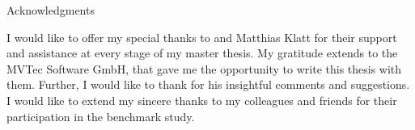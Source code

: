 
\vspace*{20mm}

\begin{center}
{ Acknowledgments}

\vspace{20mm}

I would like to offer my special thanks to \getAdvisor \space and Matthias Klatt for their support and assistance at every stage of my master thesis.
My gratitude extends to the MVTec Software GmbH, that gave me the opportunity to write this thesis with them.
Further, I would like to thank \getSupervisor \space for his insightful comments and suggestions.
I would like to extend my sincere thanks to my colleagues and friends for their participation in the benchmark study.


\end{center}

\vspace{10mm}


\cleardoublepage{}
